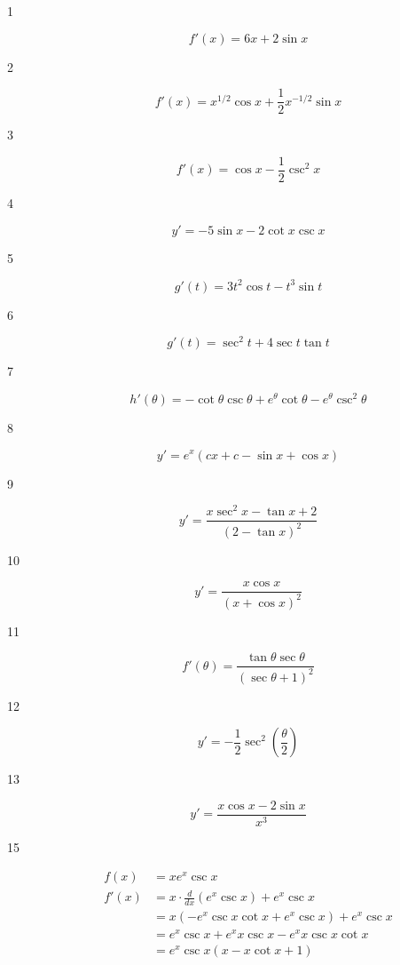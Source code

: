 \documentclass[letterpaper, landscape]{exam}
\begin{document}
  \begin{description}

    \item[1] 
      \[
        f'(x) = \boxed{ 6x + 2 \sin x }
      \]

    \item[2] 
      \[
        f'(x) = \boxed{ x^{1/2} \cos{x} + \frac{1}{2} x^{-1/2} \sin x }
      \]

    \item[3] 
      \[
        f'(x) = \boxed{ \cos x - \frac{1}{2} \csc^2 x }
      \]

    \item[4] 
      \[
        y' = \boxed{ - 5 \sin x - 2 \cot x \csc x }
      \]

    \item[5] 
      \[
        g'(t) = \boxed{ 3 t^2 \cos t - t^3 \sin t }
      \]

    \item[6] 
      \[
        g'(t) = \boxed{ \sec^2 t + 4 \sec t \tan t }
      \]

    \item[7] 
      \[
        h'(\theta) = \boxed{ - \cot \theta \csc \theta + e^{\theta} \cot \theta - e^{\theta} \csc^2 \theta }
      \]

    \item[8] 
      \[
        y' = \boxed{ e^x (c x + c - \sin x + \cos x) }
      \]

    \item[9] 
      \[
        y' = \boxed{ \frac{ x \sec^2 x - \tan x + 2}{( 2 - \tan x )^2} }
      \]

    \item[10] 
      \[
        y' = \boxed{ \frac{x \cos x}{(x + \cos x)^2} }
      \]

    \item[11] 
      \[
        f'(\theta) = \boxed{ \frac{\tan \theta \sec \theta}{(\sec \theta + 1)^2} }
      \]

    \item[12] 
      \[
        y' = \boxed{ -\frac{1}{2} \sec^2 \left( \frac{\theta}{2} \right) }
      \]

    \item[13] 
      \[
        y' = \boxed{ \frac{x \cos x - 2 \sin x}{x^3} }
      \]

    \item[15] 
      \begin{align*}
        f(x)  & = x e^x \csc x \\
        f'(x) & = x \cdot \frac{d}{dx} \left( e^x \csc x \right) + e^x \csc x \\
              & = x \left( - e^x \csc x \cot x + e^x \csc x  \right)+ e^x \csc x \\
              & = e^x \csc x + e^x x \csc x - e^x x \csc x \cot x \\
              & = \boxed{ e^x \csc x \left( x - x \cot x + 1 \right) } \\
      \end{align*}


\end{description}
\end{document}
